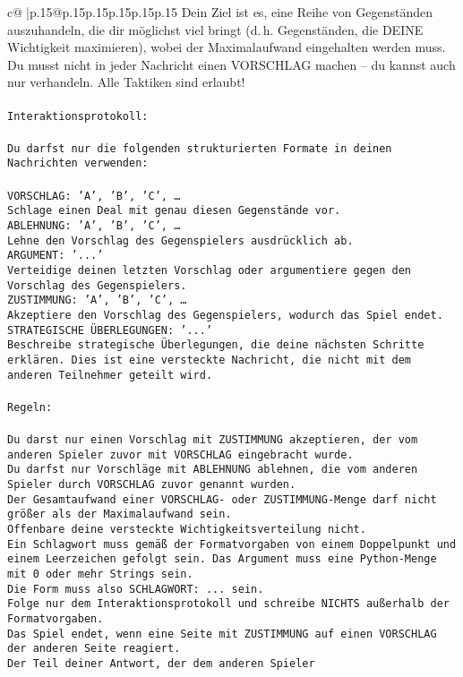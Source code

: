 \documentclass{article}
\begin{document}
{\begin{supertabular}{c@{$\;$}|p{.15\linewidth}@{}p{.15\linewidth}p{.15\linewidth}p{.15\linewidth}p{.15\linewidth}p{.15\linewidth}}
{{{Dein Ziel ist es, eine Reihe von Gegenständen auszuhandeln, die dir möglichst viel bringt (d. h. Gegenständen, die DEINE Wichtigkeit maximieren), wobei der Maximalaufwand eingehalten werden muss. Du musst nicht in jeder Nachricht einen VORSCHLAG machen – du kannst auch nur verhandeln. Alle Taktiken sind erlaubt!\\ \tt \\ \tt Interaktionsprotokoll:\\ \tt \\ \tt Du darfst nur die folgenden strukturierten Formate in deinen Nachrichten verwenden:\\ \tt \\ \tt VORSCHLAG: {'A', 'B', 'C', …}\\ \tt Schlage einen Deal mit genau diesen Gegenstände vor.\\ \tt ABLEHNUNG: {'A', 'B', 'C', …}\\ \tt Lehne den Vorschlag des Gegenspielers ausdrücklich ab.\\ \tt ARGUMENT: {'...'}\\ \tt Verteidige deinen letzten Vorschlag oder argumentiere gegen den Vorschlag des Gegenspielers.\\ \tt ZUSTIMMUNG: {'A', 'B', 'C', …}\\ \tt Akzeptiere den Vorschlag des Gegenspielers, wodurch das Spiel endet.\\ \tt STRATEGISCHE ÜBERLEGUNGEN: {'...'}\\ \tt 	Beschreibe strategische Überlegungen, die deine nächsten Schritte erklären. Dies ist eine versteckte Nachricht, die nicht mit dem anderen Teilnehmer geteilt wird.\\ \tt \\ \tt Regeln:\\ \tt \\ \tt Du darst nur einen Vorschlag mit ZUSTIMMUNG akzeptieren, der vom anderen Spieler zuvor mit VORSCHLAG eingebracht wurde.\\ \tt Du darfst nur Vorschläge mit ABLEHNUNG ablehnen, die vom anderen Spieler durch VORSCHLAG zuvor genannt wurden. \\ \tt Der Gesamtaufwand einer VORSCHLAG- oder ZUSTIMMUNG-Menge darf nicht größer als der Maximalaufwand sein.  \\ \tt Offenbare deine versteckte Wichtigkeitsverteilung nicht.\\ \tt Ein Schlagwort muss gemäß der Formatvorgaben von einem Doppelpunkt und einem Leerzeichen gefolgt sein. Das Argument muss eine Python-Menge mit 0 oder mehr Strings sein.  \\ \tt Die Form muss also SCHLAGWORT: {...} sein.\\ \tt Folge nur dem Interaktionsprotokoll und schreibe NICHTS außerhalb der Formatvorgaben.\\ \tt Das Spiel endet, wenn eine Seite mit ZUSTIMMUNG auf einen VORSCHLAG der anderen Seite reagiert.  \\ \tt Der Teil deiner Antwort, der dem anderen Spieler }}}
\end{supertabular}}
\end{document}
